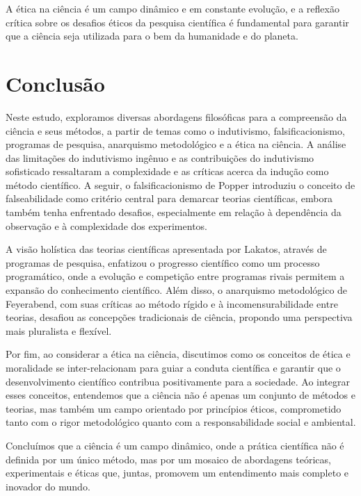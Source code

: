\documentclass{article} %
\begin{document}
A ética na ciência é um campo dinâmico e em constante evolução, e a reflexão crítica sobre os desafios éticos da pesquisa científica é fundamental para garantir que a ciência seja utilizada para o bem da humanidade e do planeta.



\section*{Conclusão}

Neste estudo, exploramos diversas abordagens filosóficas para a compreensão da ciência e seus métodos, a partir de temas como o indutivismo, falsificacionismo, programas de pesquisa, anarquismo metodológico e a ética na ciência. A análise das limitações do indutivismo ingênuo e as contribuições do indutivismo sofisticado ressaltaram a complexidade e as críticas acerca da indução como método científico. A seguir, o falsificacionismo de Popper introduziu o conceito de falseabilidade como critério central para demarcar teorias científicas, embora também tenha enfrentado desafios, especialmente em relação à dependência da observação e à complexidade dos experimentos.

A visão holística das teorias científicas apresentada por Lakatos, através de programas de pesquisa, enfatizou o progresso científico como um processo programático, onde a evolução e competição entre programas rivais permitem a expansão do conhecimento científico. Além disso, o anarquismo metodológico de Feyerabend, com suas críticas ao método rígido e à incomensurabilidade entre teorias, desafiou as concepções tradicionais de ciência, propondo uma perspectiva mais pluralista e flexível.

Por fim, ao considerar a ética na ciência, discutimos como os conceitos de ética e moralidade se inter-relacionam para guiar a conduta científica e garantir que o desenvolvimento científico contribua positivamente para a sociedade. Ao integrar esses conceitos, entendemos que a ciência não é apenas um conjunto de métodos e teorias, mas também um campo orientado por princípios éticos, comprometido tanto com o rigor metodológico quanto com a responsabilidade social e ambiental.

Concluímos que a ciência é um campo dinâmico, onde a prática científica não é definida por um único método, mas por um mosaico de abordagens teóricas, experimentais e éticas que, juntas, promovem um entendimento mais completo e inovador do mundo.
\end{document}
